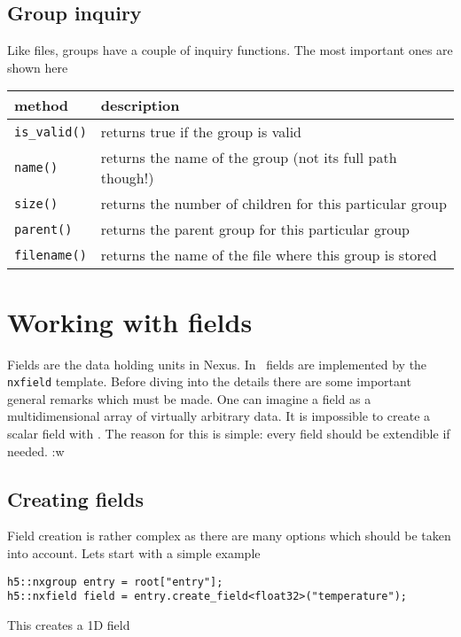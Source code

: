 \subsection{Group inquiry}

Like files, groups have a couple of inquiry functions. The most important ones
are shown here
\begin{center}
\begin{tabular}{l|l}
method & description \\
\hline\hline
{\tt is\_valid()} & returns true if the group is valid \\
\hline
{\tt name()} & returns the name of the group (not its full path though!) \\
\hline
{\tt size()} & returns the number of children for this particular group \\
\hline
{\tt parent()} & returns the parent group for this particular group \\
\hline
{\tt filename()} & returns the name of the file where this group is stored \\
\hline
\end{tabular}
\end{center}



\section{Working with fields}

Fields are the data holding units in Nexus.  In \libpniio\ fields are 
implemented by the {\tt nxfield} template. Before diving into the details there
are some important general remarks which must be made. One can imagine a field as a
multidimensional array of virtually arbitrary data. It is impossible to create 
a scalar field with \libpniio. The reason for this is simple: every field should
be extendible if needed. :w


\subsection{Creating fields}

Field creation is rather complex as there are many options which should be taken
into account. Lets start with a simple example
\begin{verbatim}
h5::nxgroup entry = root["entry"];
h5::nxfield field = entry.create_field<float32>("temperature");
\end{verbatim}
This creates a 1D field


